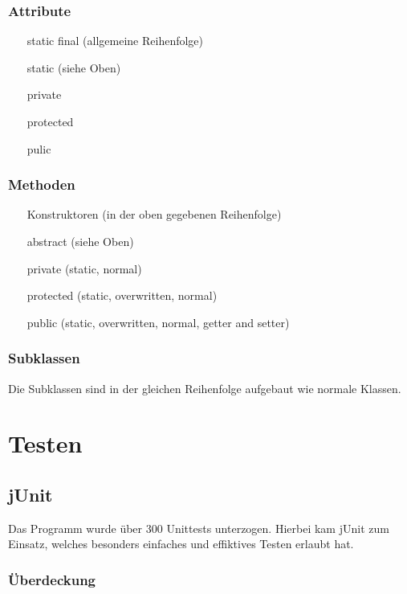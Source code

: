 \documentclass[parskip=full]{scrreprt}
\begin{document}
\subsection{Attribute}
\begin{enumerate}
	\item[static final] (allgemeine Reihenfolge) 
	\item[static] (siehe Oben)
	\item[private]
	\item[protected]
	\item[pulic]
\end{enumerate}
\subsection{Methoden}
\begin{enumerate}
	\item[Konstruktoren] (in der oben gegebenen Reihenfolge)
	\item[abstract] (siehe Oben)
	\item[private] (static, normal)
	\item[protected] (static, overwritten, normal)
	\item[public] (static, overwritten, normal, getter and setter)
\end{enumerate}
\subsection{Subklassen}
Die Subklassen sind in der gleichen Reihenfolge aufgebaut wie normale Klassen.

\chapter{Testen}

\section{jUnit}

Das Programm wurde über 300 Unittests unterzogen. Hierbei kam jUnit zum Einsatz, welches besonders einfaches und effiktives Testen erlaubt hat.

\subsection{Überdeckung}
\end{document}
